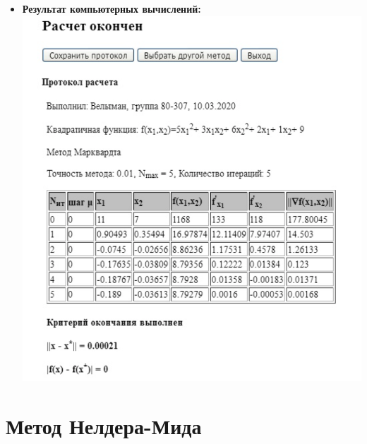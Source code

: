 \begin{itemize}
    \item {\bfseries Результат компьютерных вычислений:} \\
    \includegraphics[scale = 0.6]{img/2.PNG}
    
\end{itemize}

\pagebreak

\section{Метод Нелдера-Мида}

